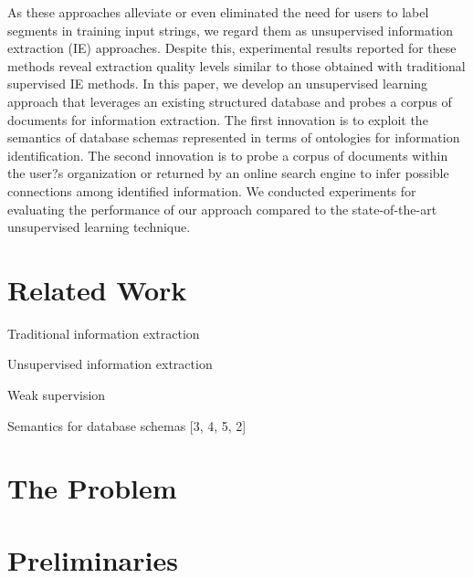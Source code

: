 \documentclass{sig-alternate}
\begin{document}
As these approaches alleviate or even eliminated the need for users to label segments in training input strings, we regard 
them as unsupervised information extraction (IE) approaches. Despite this, experimental results reported for these methods 
reveal extraction quality levels similar to those obtained with traditional supervised IE methods. 
In this paper, we develop an unsupervised learning approach that leverages an existing structured database and probes a 
corpus of documents for information extraction. The first innovation is to exploit the semantics of database schemas 
represented in terms of ontologies for information identification.  The second innovation is to probe a corpus of documents 
within the user?s organization or returned by an online search engine to infer possible connections among identified information. 
We conducted experiments for evaluating the performance of our approach compared to the state-of-the-art 
unsupervised learning technique.


%
%
\section{Related Work}
\label{sec:related-work}

Traditional information extraction

Unsupervised information extraction

Weak supervision

Semantics for database schemas [3, 4, 5, 2]


%
%
\section{The Problem}
\label{sec:problem}

%
%
\section{Preliminaries} 
\label{sec:preliminaries}



%
%
\end{document}
